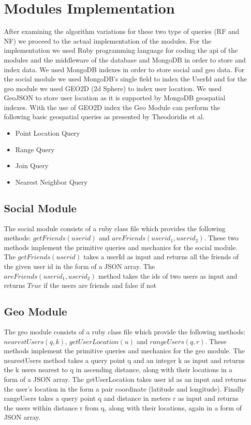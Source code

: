 \documentclass[prodmode,acmtods]{acmsmall} %
\begin{document}
\section{Modules Implementation}
After examining the algorithm variations for these two type of queries (RF and NF) we proceed to the actual implementation of the modules.
For the implementation we used Ruby\cite{ruby} programming language for coding the api of the modules and the middleware of the database and MongoDB\cite{mongod} in order to store and index data.
We used MongoDB indexes in order to store social and geo data. For the social module we used MongoDB's single field to index the UserId and for the geo module we used GEO2D (2d Sphere) to index user location. We used GeoJSON\cite{geoJSON} to store user location as it is supported by MongoDB geospatial indexes. With the use of GEO2D index the Geo Module can perform the following basic geospatial queries as presented by Theodoridis et al. \cite{Corral:ClosestPair}

\begin{itemize}
  \item Point Location Query
  \item Range Query
  \item Join Query
  \item Nearest Neighbor Query
\end{itemize}


\subsection{Social Module}
The social module consists of a ruby class file which provides the following methods:
$getFriends(userid)$ and $areFriends(userid_1, userid_2)$. These two methods implement the primitive queries and mechanics for the social module. 
The $getFriends(userid)$ takes a userId as input and returns all the friends of the given user id in the form of a JSON \cite{json} array.
The $areFriends(userid_1, userid_2)$ method takes the ids of two users as input and returns
$True$ if the users are friends and false if not

\subsection{Geo Module}
The geo module consists of a ruby class file which provide the following methods:
$nearestUsers(q, k)$, $getUserLocation(u)$ and $rangeUsers(q, r)$. These methods implement the primitive queries and mechanics for the geo module.
The nearestUsers method takes a query point q and an integer k as input and returns the k users nearest to q in ascending distance, along with their locations in a form of a JSON\cite{json} array.
The getUserLocation takes user id as an input and returns the user's location in the form a pair coordinate (latitude and longitude).
Finally rangeUsers takes a query point q and distance in meters r as input and returns the users within distance r from q, along with their locations, again in a form of JSON\cite{json} array.
\end{document}
